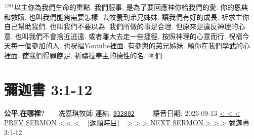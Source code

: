 \documentclass{book}
\begin{document}
$^{1281}$以主你為我們生命的重點.
我們服事.
是為了要回應神你給我們的愛.
你的恩典和救贖.
也叫我們能夠需要怎樣.
去牧養到弟兄姊妹.
讓我們有好的成長.
祈求主你自己幫助我們.
也叫我們不要以為.
我們所做的事是合理.
但原來是違反神理的心意.
也叫我們不會捨近逃遠.
或者離大去走一些捷徑.
按照神理的心意而行.
祝福今天每一個參加的人.
也祝福Youtube裡面.
有參與的弟兄姊妹.
願你在我們學武的心裡面.
使我們得罪飽足.
祈禱拉奉主的德性的名.
阿們.
\newpage



\section{彌迦書 3:1-12}
\label{sec:032802}
\textbf{公平,在哪裡?}~~~~冼嘉琪牧師
\newline
\newline
連結: \href{http://www.church.com.hk/acms/content.asp?site=cdc\&op=show\&type=product\&code=032802\&layout=sermon}{\texttt{032802}} ~~~~ 語音日期: 2026-09-13
\newline
\newline
\hyperref[sec:032801]{\small{< < < PREV SERMON < < <}}
~
\hyperref[sec:index_chronic]{\small{[返順時目]}}
~
\hyperref[sec:032803]{\small{> > > NEXT SERMON > > >}}
\newline
\newline
彌迦書 3:1-12
\newline
\end{document}
